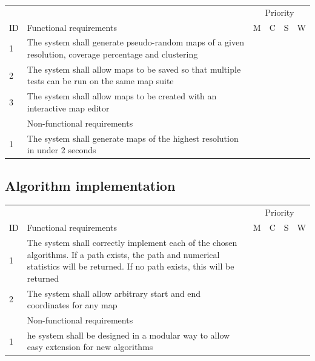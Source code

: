 \documentclass[12pt,notitlepage]{report}
\begin{document}
\begin{center}
        \begin{tabular}{@{}l p{10cm} cccc} \toprule
\multicolumn{2}{r}{~} &\multicolumn{4}{c}{Priority} \\ 
\cmidrule(l){3-6}
ID & Functional requirements & M & C & S & W  \\ \midrule
    1 & The system shall generate pseudo-random maps of a given resolution, coverage percentage and clustering & \cellcolor{green!60} & ~ & ~ & ~\\
    2 & The system shall allow maps to be saved so that multiple tests can be run on the same map suite & \cellcolor{green!60} & ~ & ~ & ~\\
    3 & The system shall allow maps to be created with an interactive map editor & ~ & ~ & \cellcolor{orange!60} & ~\\
    \midrule
    ~ & Non-functional requirements & \multicolumn{4}{r}{}  \\ \midrule
    1 & The system shall generate maps of the highest resolution in under 2 seconds & ~ & \cellcolor{yellow!80} & ~ & ~ \\  \bottomrule
\end{tabular}
\end{center}
	
\subsection{Algorithm implementation}

\begin{center}
    \begin{tabular}{@{}l p{10cm} cccc} \toprule
\multicolumn{2}{r}{~} &\multicolumn{4}{c}{Priority} \\ 
\cmidrule(l){3-6}
ID & Functional requirements & M & C & S & W  \\ \midrule
1 & The system shall correctly implement each of the chosen algorithms. If a path exists, the path and numerical statistics will be returned. If no path exists, this will be returned & \cellcolor{green!60} & ~ & ~ & ~\\
    2 & The system shall allow arbitrary start and end coordinates for any map & ~ & \cellcolor{yellow!80} & ~ & ~ \\ 
    \midrule
    ~ & Non-functional requirements & \multicolumn{4}{r}{}  \\ \midrule
    1 & he system shall be designed in a modular way to allow easy extension for new algorithms & ~ & \cellcolor{yellow!80} & ~ & ~ \\  \bottomrule
\end{tabular}
\end{center}
\end{document}
